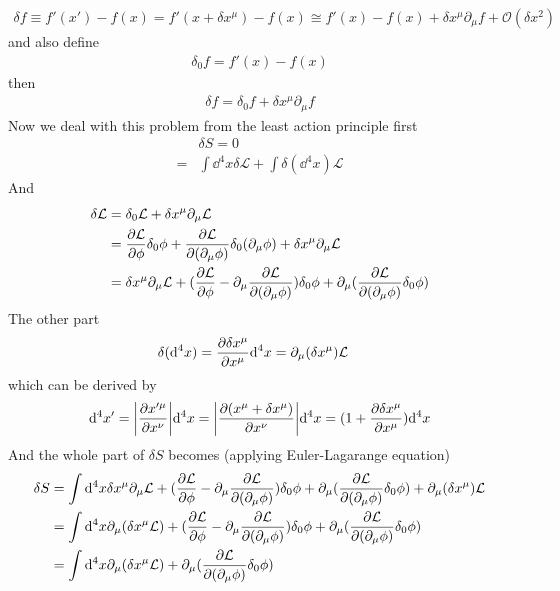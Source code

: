 \documentclass{article}
\newcommand{\lag}{\mathcal{L}}
\begin{document}
\begin{enumerate}[\bf1.]
\begin{align*}
    \delta f\equiv f'(x')-f(x)=f'(x+\delta x^{\mu})-f(x)\cong f'(x)-f(x)+\delta x^{\mu}\partial_{\mu}f+\mathcal{O}(\delta x^2)
  \end{align*}
  and also define
  \begin{align*}
    \delta_0 f=f'(x)-f(x)
  \end{align*}
  then
  \begin{align*}
    \delta f=\delta_0 f+\delta x^{\mu}\partial_{\mu}f
  \end{align*}
  Now we deal with this problem from the least action principle first
  \begin{align*}
    &\delta S=0\\
    =&\int\dd^4x\delta\lag+\int\delta(\dd^4x)\lag
  \end{align*}
  And
  \begin{align*}
    \delta\lag&=\delta_0\lag+\delta x^{\mu}\partial_{\mu}\lag\\
    &=\pdv{\lag}{\phi}\delta_0\phi+\pdv{\lag}{(\partial_{\mu}\phi)}\delta_0(\partial_{\mu}\phi)+\delta x^{\mu}\partial_{\mu}\lag\\
    &=\delta x^{\mu}\partial_{\mu}\lag+(\pdv{\lag}{\phi}-\partial_{\mu}\pdv{\lag}{(\partial_{\mu}\phi)})\delta_0\phi+\partial_{\mu}(\pdv{\lag}{(\partial_{\mu}\phi)}\delta_0\phi)
  \end{align*}
  The other part
  \begin{align*}
    \delta(\dd^4x)&=\pdv{\delta x^{\mu}}{x^{\mu}}\dd^4x=\partial_{\mu}(\delta x^{\mu})\lag
  \end{align*}
  which can be derived by
  \begin{align*}
    \dd^4x'=\abs{\pdv{x'^{\mu}}{x^{\nu}}}\dd^4x=\abs{\pdv{(x^{\mu}+\delta x^{\mu})}{x^{\nu}}}\dd^4x=(1+\pdv{\delta x^{\mu}}{x^{\mu}})\dd^4x
  \end{align*}
  And the whole part of $\delta S$ becomes (applying Euler-Lagarange equation)
  \begin{align*}
    \delta S&=\int\dd^4x \delta x^{\mu}\partial_{\mu}\lag+(\pdv{\lag}{\phi}-\partial_{\mu}\pdv{\lag}{(\partial_{\mu}\phi)})\delta_0\phi+\partial_{\mu}(\pdv{\lag}{(\partial_{\mu}\phi)}\delta_0\phi)+ \partial_{\mu}(\delta x^{\mu})\lag\\
    &=\int\dd^4x \partial_{\mu}(\delta x^{\mu}\lag)+(\pdv{\lag}{\phi}-\partial_{\mu}\pdv{\lag}{(\partial_{\mu}\phi)})\delta_0\phi+\partial_{\mu}(\pdv{\lag}{(\partial_{\mu}\phi)}\delta_0\phi)\\
    &=\int\dd^4x \partial_{\mu}(\delta x^{\mu}\lag)+\partial_{\mu}(\pdv{\lag}{(\partial_{\mu}\phi)}\delta_0\phi)

\end{align*}
\end{enumerate}
\end{document}
